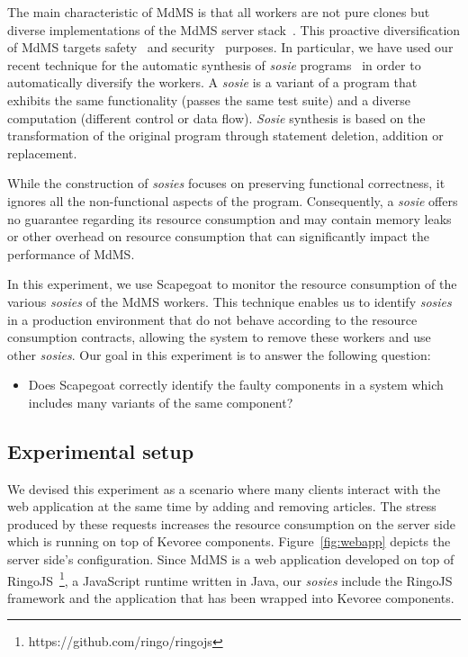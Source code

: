 The main characteristic of MdMS is that all workers are not pure clones but diverse implementations of the MdMS server stack~\cite{alliermulti}.
This proactive diversification of MdMS targets safety~\cite{avizienis85} and security~\cite{Forrest97} purposes.
In particular, we have used our recent technique for the automatic synthesis of \textit{sosie} programs~\cite{baudry2014tailored} in order to automatically diversify the workers. 
A \textit{sosie} is a variant of a program that exhibits the same functionality (passes the same test suite) and a diverse computation (different control or data flow). 
\textit{Sosie} synthesis is based on the transformation of the original program through statement deletion, addition or replacement.

While the construction of \textit{sosies} focuses on preserving functional correctness, it ignores all the non-functional aspects of the program.
Consequently, a \textit{sosie} offers no guarantee regarding its resource consumption and may contain memory leaks or other overhead on resource consumption that can significantly impact the performance of MdMS.

In this experiment, we use Scapegoat to monitor the resource consumption of the various \textit{sosies} of the MdMS workers.
This technique enables us to identify \textit{sosies} in a production environment that do not behave according to the resource consumption contracts, allowing the system to remove these workers and use other \textit{sosies}.
Our goal in this experiment is to answer the following question:

\begin{itemize}
 \item Does Scapegoat correctly identify the faulty components in a system which includes many variants of the same component?   
\end{itemize}

\subsection{Experimental setup}

We devised this experiment as a scenario where many clients interact with the web application at the same time by adding and removing articles.
The stress produced by these requests increases the resource consumption on the server side which is running on top of Kevoree components.
Figure~\ref{fig:webapp} depicts the server side's configuration.
Since MdMS is a web application developed on top of RingoJS~\footnote{https://github.com/ringo/ringojs}, a JavaScript runtime written in Java, our \textit{sosies} include the RingoJS framework and the application that has been wrapped into Kevoree components.

